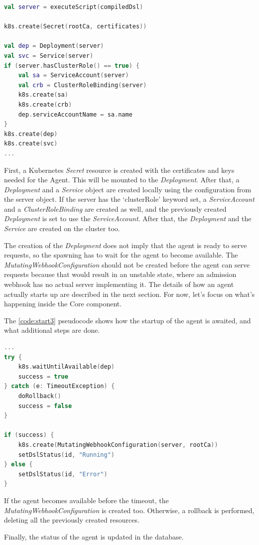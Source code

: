 \begin{lstlisting}[caption={Spawning of an agent},language=Kotlin,label=code:start2]
val server = executeScript(compiledDsl)

k8s.create(Secret(rootCa, certificates))

val dep = Deployment(server)
val svc = Service(server)
if (server.hasClusterRole() == true) {
    val sa = ServiceAccount(server)
    val crb = ClusterRoleBinding(server)
    k8s.create(sa)
    k8s.create(crb)
    dep.serviceAccountName = sa.name
}
k8s.create(dep)
k8s.create(svc)
...
\end{lstlisting}

First, a Kubernetes \emph{Secret} resource is created with the certificates and keys needed for the Agent. This will be mounted to the \emph{Deployment}.
After that, a \emph{Deployment} and a \emph{Service} object are created locally using the configuration from the server object. If the server has the `clusterRole' keyword set, a \emph{ServiceAccount} and a \emph{ClusterRoleBinding} are created as well, and the previously created \emph{Deployment} is set to use the \emph{ServiceAccount}. After that, the \emph{Deployment} and the \emph{Service} are created on the cluster too.

The creation of the \emph{Deployment} does not imply that the agent is ready to serve requests, so the spawning has to wait for the agent to become available. The \emph{MutatingWebhookConfiguration} should not be created before the agent can serve requests because that would result in an unstable state, where an admission webhook has no actual server implementing it. The details of how an agent actually starts up are described in the next section. For now, let's focus on what's happening inside the Core component.

The \ref{code:start3} pseudocode shows how the startup of the agent is awaited, and what additional steps are done.

\begin{lstlisting}[caption={Spawning of an agent},language=Kotlin,label=code:start3]
...
try {
    k8s.waitUntilAvailable(dep)
    success = true
} catch (e: TimeoutException) {
    doRollback()
    success = false
}
        
if (success) {
    k8s.create(MutatingWebhookConfiguration(server, rootCa))
    setDslStatus(id, "Running")
} else {
    setDslStatus(id, "Error")
}
\end{lstlisting}

If the agent becomes available before the timeout, the \emph{MutatingWebhookConfiguration} is created too. Otherwise, a rollback is performed, deleting all the previously created resources.

Finally, the status of the agent is updated in the database.

